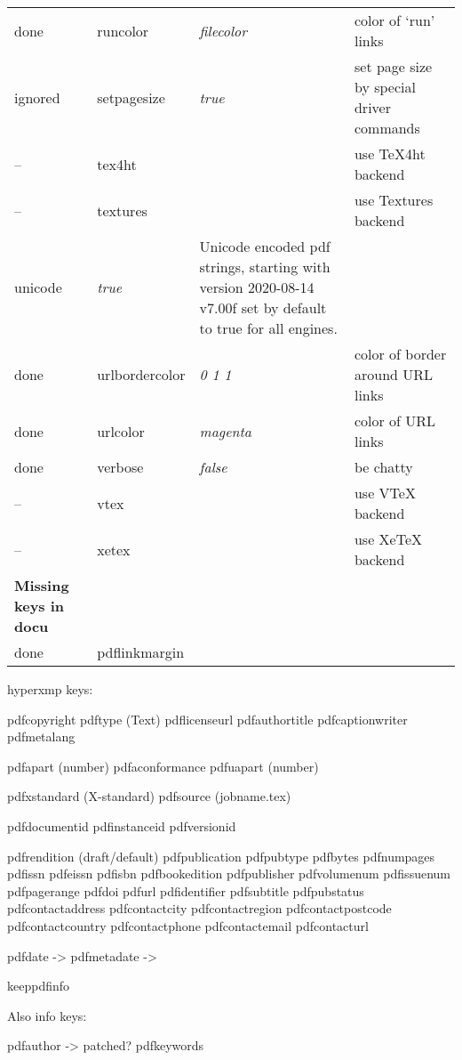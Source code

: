 \begin{longtable}{@{}l>{\ttfamily}llp{7cm}@{}}
done & runcolor           & \textit{filecolor}     & color of `run' links\\
ignored &setpagesize        & \textit{true}          & set page size by special driver commands \\
-- & tex4ht             &                        & use \textsf{\TeX4ht} backend \\
-- & textures           &                        & use \textsf{Textures} backend \\
unicode            & \textit{true}          & Unicode encoded pdf strings, starting with version  2020-08-14 v7.00f set by default to true for all engines. \\
done & urlbordercolor     & \textit{0 1 1}         & color of border around URL links \\
done & urlcolor           & \textit{magenta}       & color of URL links \\
done & verbose            & \textit{false}         & be chatty \\
-- & vtex               &                        & use \textsf{VTeX} backend\\
-- & xetex              &                        & use \textsf{Xe\TeX} backend\\
\textbf{Missing keys in docu}\\
done & pdflinkmargin    &
\end{longtable} 

hyperxmp keys:

pdfcopyright 
pdftype   (Text)
pdflicenseurl
pdfauthortitle
pdfcaptionwriter
pdfmetalang

pdfapart  (number)
pdfaconformance
pdfuapart (number)

pdfxstandard  (X-standard) 
pdfsource (jobname.tex)

pdfdocumentid
pdfinstanceid
pdfversionid

pdfrendition (draft/default)
pdfpublication
pdfpubtype
pdfbytes
pdfnumpages
pdfissn
pdfeissn
pdfisbn
pdfbookedition
pdfpublisher
pdfvolumenum
pdfissuenum
pdfpagerange
pdfdoi
pdfurl
pdfidentifier
pdfsubtitle
pdfpubstatus
pdfcontactaddress
pdfcontactcity
pdfcontactregion
pdfcontactpostcode
pdfcontactcountry
pdfcontactphone
pdfcontactemail
pdfcontacturl

pdfdate -> \@pdfdatetime
pdfmetadate -> \@pdfmetadatetime

keeppdfinfo


Also info keys:

pdfauthor    -> patched?
pdfkeywords


